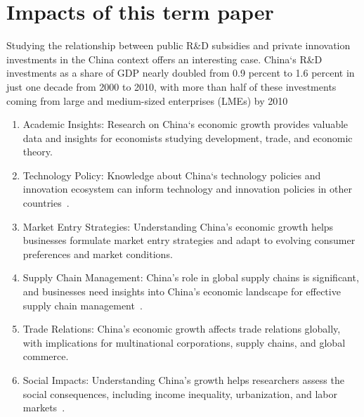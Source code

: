\section{Impacts of this term paper}

Studying the relationship between public R\&D subsidies and private innovation investments in the China 
context offers an interesting case. China`s R\&D investments as a share of GDP nearly doubled from 0.9 
percent to 1.6 percent in just one decade from 2000 to 2010, with more than half of these investments 
coming from large and medium-sized enterprises (LMEs) by 2010~\cite{BOEING2022121212}

\begin{enumerate}
    \item Academic Insights: Research on China`s economic growth provides valuable data and 
    insights for economists studying development, trade, and economic theory.
    \item Technology Policy: Knowledge about China`s technology policies and innovation ecosystem can 
    inform technology and innovation policies in other countries~\cite{surie2017creating}.
    \item Market Entry Strategies: Understanding China's economic growth helps businesses formulate 
    market entry strategies and adapt to evolving consumer preferences and market conditions.
    \item Supply Chain Management: China's role in global supply chains is significant, and businesses 
    need insights into China's economic landscape for effective supply chain management~\cite{li2009china}.
    \item Trade Relations: China's economic growth affects trade relations globally, with implications 
    for multinational corporations, supply chains, and global commerce.
    \item Social Impacts: Understanding China's growth helps researchers assess the social consequences, 
    including income inequality, urbanization, and labor markets~\cite{chen1996regional}.
\end{enumerate}

